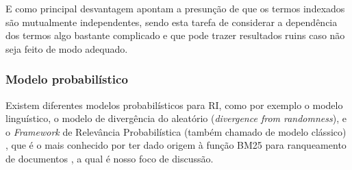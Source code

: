         E como principal desvantagem apontam a presunção de que os termos indexados são mutualmente independentes, sendo esta tarefa de considerar a dependência dos termos algo bastante complicado e que pode trazer resultados ruins caso não seja feito de modo adequado.
    
    \subsubsection{Modelo probabilístico}  \label{subsubsec:Modelo-probabilístico}
        Existem diferentes modelos probabilísticos para RI, como por exemplo o modelo linguístico, o modelo de divergência do aleatório (\textit{divergence from randomness}), e o \textit{Framework} de Relevância Probabilística (também chamado de modelo clássico) \cite[p.~87]{Zhai2016TDMA}, que é o mais conhecido por ter dado origem à função BM25\footnotemark{} para ranqueamento de documentos \cite[p.~334--335]{robertson_probabilistic_2010} \cite[p.~111]{Zhai2016TDMA}, a qual é nosso foco de discussão.
        
        
